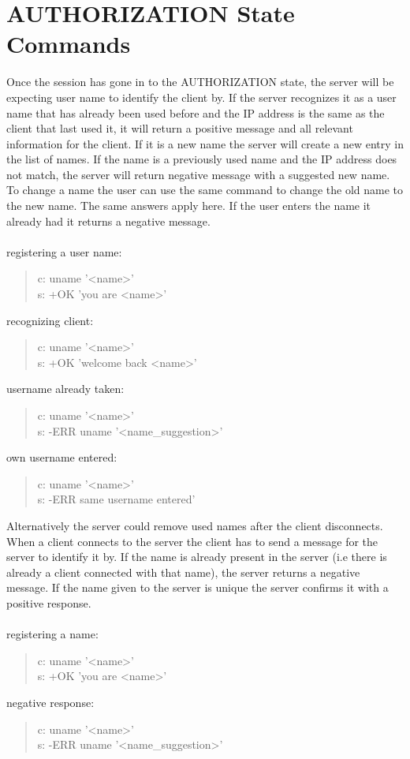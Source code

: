 \documentclass[a4paper,11pt]{article}
\begin{document}
\section{AUTHORIZATION State Commands}
Once the session has gone in to the AUTHORIZATION state, the server will be expecting user name to identify the client by. If the server recognizes it as a user name that has already been used before and the IP address is the same as the client that last used it, it will return a positive message and all relevant information for the client. If it is a new name the server will create a new entry in the list of names. If the name is a previously used name and the IP address does not match, the server will return negative message with a suggested new name. 
To change a name the user can use the same command to change the old name to the new name. The same answers apply here. If the user enters the name it already had it returns a negative message.\\\\
registering a user name:
\begin{quote}
  c: uname '<name>'\\
  s: +OK 'you are <name>'
\end{quote}
\noindent
recognizing client:
\begin{quote}
  c: uname '<name>'\\
  s: +OK 'welcome back <name>'
\end{quote}
\noindent
username already taken:
\begin{quote}
  c: uname '<name>'\\
  s: -ERR uname '<name\_suggestion>'
\end{quote}
\noindent
own username entered:
\begin{quote}
  c: uname '<name>'\\
  s: -ERR same username entered'
\end{quote}

\noindent
Alternatively the server could remove used names after the client disconnects. When a client connects to the server the client has to send a message for the server to identify it by. If the name is already present in the server (i.e there is already a client connected with that name), the server returns a negative message. If the name given to the server is unique the server confirms it with a positive response.\\\\
registering a name:

\begin{quote}
  c: uname '<name>'\\
  s: +OK 'you are <name>'
\end{quote}
\noindent
negative response:
\begin{quote}
  c: uname '<name>'\\
  s: -ERR uname '<name\_suggestion>'
\end{quote}
\end{document}
